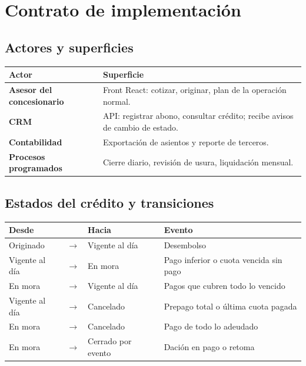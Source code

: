 \documentclass[11pt,a4paper]{article}
\begin{document}
\section{Contrato de implementación}

\subsection*{Actores y superficies}
\begin{tabularx}{\linewidth}{>{\bfseries}l X}
\toprule
Actor & Superficie \\
\midrule
Asesor del concesionario & Front React: cotizar, originar, plan de la operación normal. \\
CRM & API: registrar abono, consultar crédito; recibe avisos de cambio de estado. \\
Contabilidad & Exportación de asientos y reporte de terceros. \\
Procesos programados & Cierre diario, revisión de usura, liquidación mensual. \\
\bottomrule
\end{tabularx}

\subsection*{Estados del crédito y transiciones}
\begin{center}
\begin{tabular}{l c l l}
\toprule
Desde & & Hacia & Evento \\
\midrule
Originado & $\rightarrow$ & Vigente al día & Desembolso \\
Vigente al día & $\rightarrow$ & En mora & Pago inferior o cuota vencida sin pago \\
En mora & $\rightarrow$ & Vigente al día & Pagos que cubren todo lo vencido \\
Vigente al día & $\rightarrow$ & Cancelado & Prepago total o última cuota pagada \\
En mora & $\rightarrow$ & Cancelado & Pago de todo lo adeudado \\
En mora & $\rightarrow$ & Cerrado por evento & Dación en pago o retoma \\
\bottomrule
\end{tabular}
\end{center}
\end{document}
